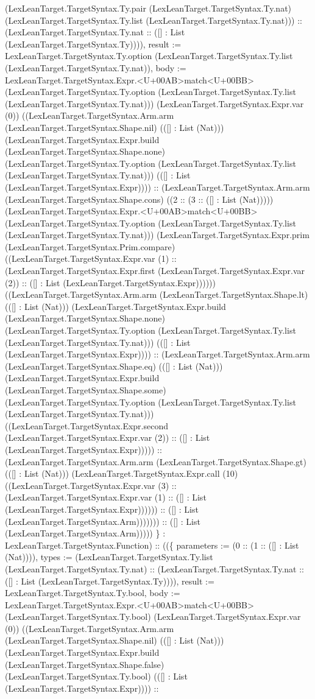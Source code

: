 \documentclass[11pt]{article}
\begin{document}
(LexLeanTarget.TargetSyntax.Ty.pair (LexLeanTarget.TargetSyntax.Ty.nat) (LexLeanTarget.TargetSyntax.Ty.list (LexLeanTarget.TargetSyntax.Ty.nat))) :: (LexLeanTarget.TargetSyntax.Ty.nat :: ([] : List (LexLeanTarget.TargetSyntax.Ty)))), result := LexLeanTarget.TargetSyntax.Ty.option (LexLeanTarget.TargetSyntax.Ty.list (LexLeanTarget.TargetSyntax.Ty.nat)), body := LexLeanTarget.TargetSyntax.Expr.<U+00AB>match<U+00BB> (LexLeanTarget.TargetSyntax.Ty.option (LexLeanTarget.TargetSyntax.Ty.list (LexLeanTarget.TargetSyntax.Ty.nat))) (LexLeanTarget.TargetSyntax.Expr.var (0)) ((LexLeanTarget.TargetSyntax.Arm.arm (LexLeanTarget.TargetSyntax.Shape.nil) (([] : List (Nat))) (LexLeanTarget.TargetSyntax.Expr.build (LexLeanTarget.TargetSyntax.Shape.none) (LexLeanTarget.TargetSyntax.Ty.option (LexLeanTarget.TargetSyntax.Ty.list (LexLeanTarget.TargetSyntax.Ty.nat))) (([] : List (LexLeanTarget.TargetSyntax.Expr)))) :: (LexLeanTarget.TargetSyntax.Arm.arm (LexLeanTarget.TargetSyntax.Shape.cons) ((2 :: (3 :: ([] : List (Nat))))) (LexLeanTarget.TargetSyntax.Expr.<U+00AB>match<U+00BB> (LexLeanTarget.TargetSyntax.Ty.option (LexLeanTarget.TargetSyntax.Ty.list (LexLeanTarget.TargetSyntax.Ty.nat))) (LexLeanTarget.TargetSyntax.Expr.prim (LexLeanTarget.TargetSyntax.Prim.compare) ((LexLeanTarget.TargetSyntax.Expr.var (1) :: (LexLeanTarget.TargetSyntax.Expr.first (LexLeanTarget.TargetSyntax.Expr.var (2)) :: ([] : List (LexLeanTarget.TargetSyntax.Expr)))))) ((LexLeanTarget.TargetSyntax.Arm.arm (LexLeanTarget.TargetSyntax.Shape.lt) (([] : List (Nat))) (LexLeanTarget.TargetSyntax.Expr.build (LexLeanTarget.TargetSyntax.Shape.none) (LexLeanTarget.TargetSyntax.Ty.option (LexLeanTarget.TargetSyntax.Ty.list (LexLeanTarget.TargetSyntax.Ty.nat))) (([] : List (LexLeanTarget.TargetSyntax.Expr)))) :: (LexLeanTarget.TargetSyntax.Arm.arm (LexLeanTarget.TargetSyntax.Shape.eq) (([] : List (Nat))) (LexLeanTarget.TargetSyntax.Expr.build (LexLeanTarget.TargetSyntax.Shape.some) (LexLeanTarget.TargetSyntax.Ty.option (LexLeanTarget.TargetSyntax.Ty.list (LexLeanTarget.TargetSyntax.Ty.nat))) ((LexLeanTarget.TargetSyntax.Expr.second (LexLeanTarget.TargetSyntax.Expr.var (2)) :: ([] : List (LexLeanTarget.TargetSyntax.Expr))))) :: (LexLeanTarget.TargetSyntax.Arm.arm (LexLeanTarget.TargetSyntax.Shape.gt) (([] : List (Nat))) (LexLeanTarget.TargetSyntax.Expr.call (10) ((LexLeanTarget.TargetSyntax.Expr.var (3) :: (LexLeanTarget.TargetSyntax.Expr.var (1) :: ([] : List (LexLeanTarget.TargetSyntax.Expr)))))) :: ([] : List (LexLeanTarget.TargetSyntax.Arm))))))) :: ([] : List (LexLeanTarget.TargetSyntax.Arm))))) \} : LexLeanTarget.TargetSyntax.Function) :: ((\{ parameters := (0 :: (1 :: ([] : List (Nat)))), types := (LexLeanTarget.TargetSyntax.Ty.list (LexLeanTarget.TargetSyntax.Ty.nat) :: (LexLeanTarget.TargetSyntax.Ty.nat :: ([] : List (LexLeanTarget.TargetSyntax.Ty)))), result := LexLeanTarget.TargetSyntax.Ty.bool, body := LexLeanTarget.TargetSyntax.Expr.<U+00AB>match<U+00BB> (LexLeanTarget.TargetSyntax.Ty.bool) (LexLeanTarget.TargetSyntax.Expr.var (0)) ((LexLeanTarget.TargetSyntax.Arm.arm (LexLeanTarget.TargetSyntax.Shape.nil) (([] : List (Nat))) (LexLeanTarget.TargetSyntax.Expr.build (LexLeanTarget.TargetSyntax.Shape.false) (LexLeanTarget.TargetSyntax.Ty.bool) (([] : List (LexLeanTarget.TargetSyntax.Expr)))) :: 
\end{document}

